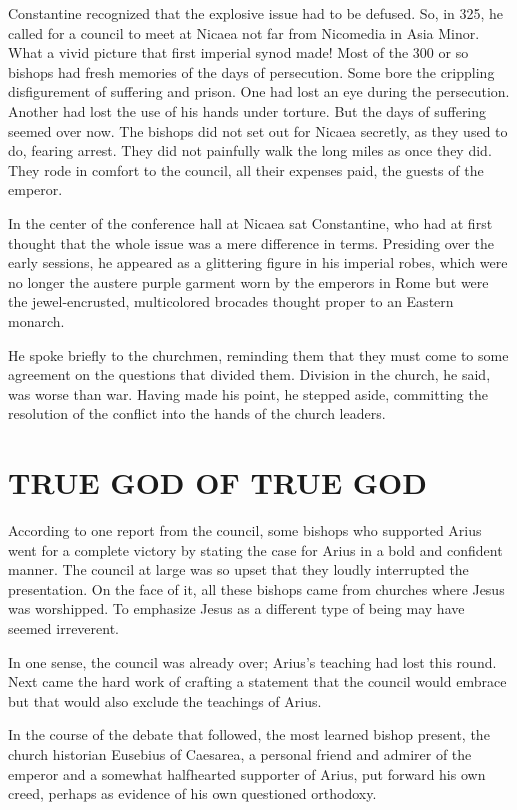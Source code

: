 Constantine recognized that the explosive issue had to be defused. So, in 325, he called for a
council to meet at Nicaea not far from Nicomedia in Asia Minor. What a vivid picture that first
imperial synod made! Most of the 300 or so bishops had fresh memories of the days of persecution.
Some bore the crippling disfigurement of suffering and prison. One had lost an eye during the
persecution. Another had lost the use of his hands under torture. But the days of suffering seemed
over now. The bishops did not set out for Nicaea secretly, as they used to do, fearing arrest. They
did not painfully walk the long miles as once they did. They rode in comfort to the council, all
their expenses paid, the guests of the emperor.

In the center of the conference hall at Nicaea sat Constantine, who had at first thought that the
whole issue was a mere difference in terms. Presiding over the early sessions, he appeared as a
glittering figure in his imperial robes, which were no longer the austere purple garment worn by the
emperors in Rome but were the jewel-encrusted, multicolored brocades thought proper to an Eastern
monarch.

He spoke briefly to the churchmen, reminding them that they must come to some agreement on the
questions that divided them. Division in the church, he said, was worse than war. Having made his
point, he stepped aside, committing the resolution of the conflict into the hands of the church
leaders.

\section{TRUE GOD OF TRUE GOD}

According to one report from the council, some bishops who supported Arius went for a complete
victory by stating the case for Arius in a bold and confident manner. The council at large was so
upset that they loudly interrupted the presentation. On the face of it, all these bishops came from
churches where Jesus was worshipped. To emphasize Jesus as a different type of being may have seemed
irreverent.

In one sense, the council was already over; Arius’s teaching had lost this round. Next came the hard
work of crafting a statement that the council would embrace but that would also exclude the
teachings of Arius.

In the course of the debate that followed, the most learned bishop present, the church historian
Eusebius of Caesarea, a personal friend and admirer of the emperor and a somewhat halfhearted
supporter of Arius, put forward his own creed, perhaps as evidence of his own questioned orthodoxy.

